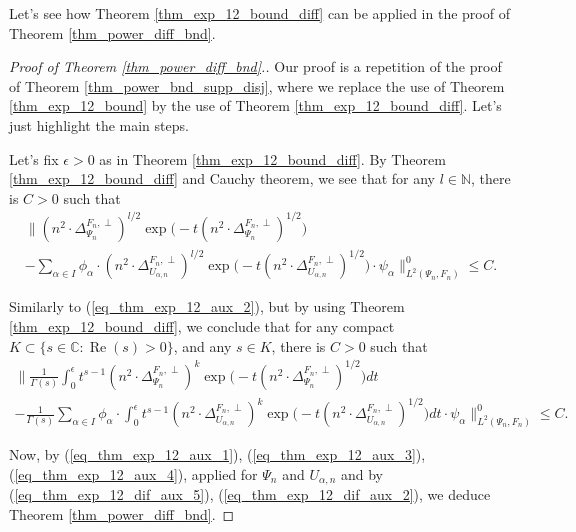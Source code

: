 \documentclass[12pt]{article}
\numberwithin{equation}{section}
\theoremstyle{theorem}
\theoremstyle{definition}
\theoremstyle{remark}
\newcommand{\comp}{\mathbb{C}}
\newcommand{\nat}{\mathbb{N}}
\newcommand{\laplcomp}{\Delta}
\renewcommand{\Re}{\operatorname{Re}}
\begin{document}
	Let's see how Theorem \ref{thm_exp_12_bound_diff} can be applied in the proof of  Theorem  \ref{thm_power_diff_bnd}.
	\begin{proof}[Proof of Theorem \ref{thm_power_diff_bnd}.]
		Our proof is a repetition of the proof of Theorem \ref{thm_power_bnd_supp_disj}, where we replace the use of Theorem \ref{thm_exp_12_bound} by the use of Theorem \ref{thm_exp_12_bound_diff}.
		Let's just highlight the main steps.
		\par 
		Let's fix $\epsilon > 0$ as in Theorem \ref{thm_exp_12_bound_diff}.
		By Theorem \ref{thm_exp_12_bound_diff} and Cauchy theorem, we see  that for any $l \in \nat$, there is $C > 0$ such that
		\begin{multline}\label{eq_thm_exp_12_dif_aux_5}
			\Big\| (n^2 \cdot\laplcomp_{\Psi_n}^{F_n, \perp})^{l/2} \exp \big(-t (n^2 \cdot\laplcomp_{\Psi_n}^{F_n, \perp})^{1/2} \big) 
			\\			
			-
			\sum_{\alpha \in I} \phi_{\alpha}
			\cdot
			(n^2 \cdot \laplcomp_{U_{\alpha, n}}^{F_n, \perp})^{l/2}  \exp \big( -t  (n^2 \cdot  \laplcomp_{U_{\alpha, n}}^{F_n, \perp})^{1/2} \big) 
			\cdot
			\psi_{\alpha}
			\Big\|_{L^2(\Psi_n, F_n)}^{0} \leq C.
		\end{multline}
		\par 
		Similarly to (\ref{eq_thm_exp_12_aux_2}), but by using Theorem \ref{thm_exp_12_bound_diff}, we conclude that for any compact $K \subset \{s \in \comp : \Re(s) > 0 \}$, and any $s \in K$, there is $C > 0$ such that
		\begin{multline}\label{eq_thm_exp_12_dif_aux_2}
			\Big\|
			\frac{1}{\Gamma(s)}
			\int_0^{\epsilon} t^{s-1} (n^2 \cdot\laplcomp_{\Psi_n}^{F_n, \perp})^{k} \exp \big(-t (n^2 \cdot\laplcomp_{\Psi_n}^{F_n, \perp})^{1/2} \big) dt
			\\
			-
			\frac{1}{\Gamma(s)}
			\sum_{\alpha \in I} \phi_{\alpha}
			\cdot
			\int_0^{\epsilon} t^{s-1} 
			(n^2 \cdot \laplcomp_{U_{\alpha, n}}^{F_n, \perp})^{k}  \exp \big( -t  (n^2 \cdot  \laplcomp_{U_{\alpha, n}}^{F_n, \perp})^{1/2} \big) 
			dt
			\cdot
			\psi_{\alpha}
			\Big\|_{L^2(\Psi_n, F_n)}^{0} 
			\leq 
			C.
		\end{multline}
		\par 
		Now, by (\ref{eq_thm_exp_12_aux_1}),  (\ref{eq_thm_exp_12_aux_3}),  (\ref{eq_thm_exp_12_aux_4}), applied for $\Psi_n$ and $U_{\alpha, n}$ and by (\ref{eq_thm_exp_12_dif_aux_5}), (\ref{eq_thm_exp_12_dif_aux_2}), we deduce Theorem \ref{thm_power_diff_bnd}. 
	\end{proof}
\end{document}
